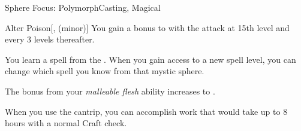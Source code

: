 \begin{feat}{Sphere Focus: Polymorph}{Casting, Magical}
\begin{freeability}{Alter Poison}[,  (minor)]
            \rankline
            You gain a  bonus to  with the attack at 15th level and every 3 levels thereafter.
        \end{freeability}

         You learn a spell from the  .
        When you gain access to a new spell level, you can change which spell you know from that mystic sphere.

         The bonus from your \textit{malleable flesh} ability increases to .

         When you use the  cantrip, you can accomplish work that would take up to 8 hours with a normal Craft check.
    \end{feat}

